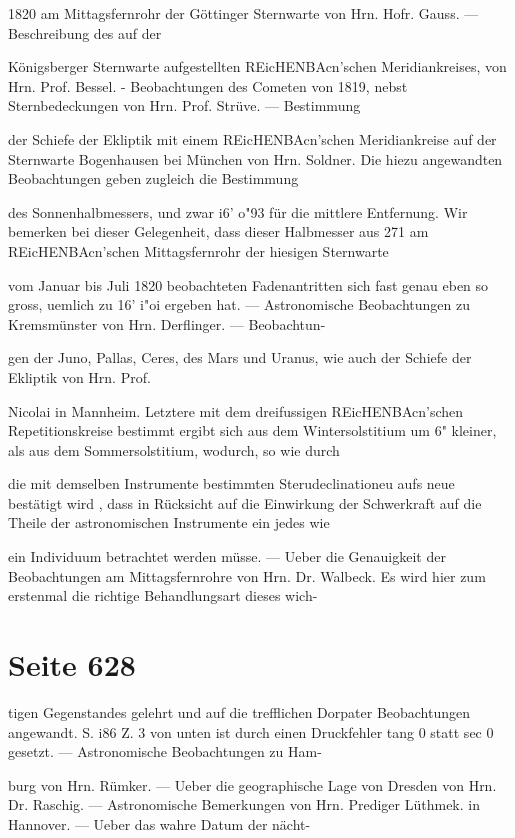\documentclass[10pt,a4paper]{article}
\begin{document}
1820 am Mittagsfernrohr der Göttinger Sternwarte von Hrn. Hofr. Gauss. — Beschreibung des auf der

Königsberger Sternwarte aufgestellten REicHENBAcn'schen Meridiankreises, von Hrn. Prof. Bessel. - Beobachtungen des Cometen von 1819, nebst Sternbedeckungen von Hrn. Prof. Strüve. — Bestimmung

der Schiefe der Ekliptik mit einem REicHENBAcn'schen Meridiankreise auf der Sternwarte Bogenhausen bei München von Hrn. Soldner. Die hiezu angewandten Beobachtungen geben zugleich die Bestimmung

des Sonnenhalbmessers, und zwar i6' o"93 für die mittlere Entfernung. Wir bemerken bei dieser Gelegenheit, dass dieser Halbmesser aus 271 am REicHENBAcn'schen Mittagsfernrohr der hiesigen Sternwarte

vom Januar bis Juli 1820 beobachteten Fadenantritten sich fast genau eben so gross, uemlich zu 16' i"oi ergeben hat. — Astronomische Beobachtungen zu Kremsmünster von Hrn. Derflinger. — Beobachtun-

gen der Juno, Pallas, Ceres, des Mars und Uranus, wie auch der Schiefe der Ekliptik von Hrn. Prof.

Nicolai in Mannheim. Letztere mit dem dreifussigen REicHENBAcn'schen Repetitionskreise bestimmt ergibt sich aus dem Wintersolstitium um 6" kleiner, als aus dem Sommersolstitium, wodurch, so wie durch

die mit demselben Instrumente bestimmten Sterudeclinationeu aufs neue bestätigt wird , dass in Rücksicht auf die Einwirkung der Schwerkraft auf die Theile der astronomischen Instrumente ein jedes wie

ein Individuum betrachtet werden müsse. — Ueber die Genauigkeit der Beobachtungen am Mittagsfernrohre von Hrn. Dr. Walbeck. Es wird hier zum erstenmal die richtige Behandlungsart dieses wich-


\newpage
\section*{Seite 628}
tigen Gegenstandes gelehrt und auf die trefflichen Dorpater Beobachtungen angewandt. S. i86 Z. 3 von unten ist durch einen Druckfehler tang 0 statt sec 0 gesetzt. — Astronomische Beobachtungen zu Ham-

burg von Hrn. Rümker. — Ueber die geographische Lage von Dresden von Hrn. Dr. Raschig. — Astronomische Bemerkungen von Hrn. Prediger Lüthmek. in Hannover. — Ueber das wahre Datum der nächt-
\end{document}
